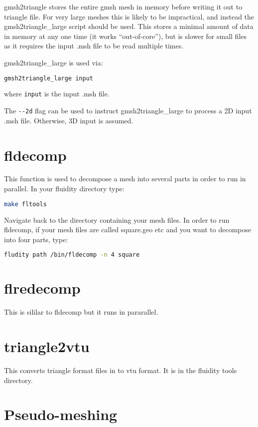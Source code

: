 gmsh2triangle stores the entire gmsh mesh in memory before writing it out to
triangle file. For very large meshes this is likely to be impractical,
and instead the gmsh2triangle\_large script should be used. This stores a minimal
amount of data in memory at any one time (it works ``out-of-core''), but
is slower for small files as it requires the input .msh file to be read multiple
times.

gmsh2triangle\_large is used via:

\begin{lstlisting}[language = Bash]
gmsh2triangle_large input
\end{lstlisting}

where \lstinline[language = Bash]*input* is the input .msh file.

The \lstinline[language = Bash]+--2d+ flag can be used to instruct gmsh2triangle\_large
to process a 2D input .msh file. Otherwise, 3D input is assumed.

\section{fldecomp}
This function is used to decompose a mesh into several parts in order to run in parallel.  In your fluidity directory type:
\begin{lstlisting}[language = Bash]
make fltools
\end{lstlisting}
Navigate back to the directory containing your mesh files. In order to run fldecomp, if your mesh files are called square.geo etc and you want to decompose into four parts, type:
\begin{lstlisting}[language = Bash]
fludity path /bin/fldecomp -n 4 square
\end{lstlisting}

\section{flredecomp}
This is sililar to fldecomp but it runs in pararallel.

\section{triangle2vtu}
This converts triangle format files in to vtu format. It is in the fluidity tools directory.

\section{Pseudo-meshing}

